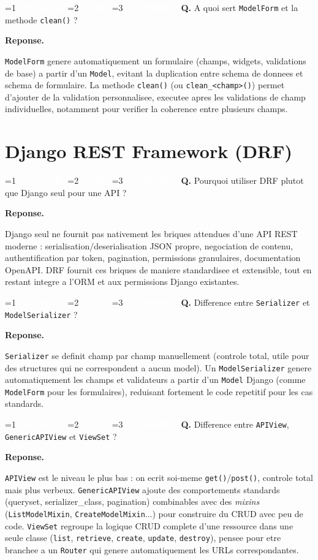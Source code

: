 \documentclass[11pt,a4paper]{article}
\newcommand{\badgeJ}{\textcolor{white}{\colorbox{junior}{\small\bfseries\ JUNIOR\ }}}
\newcommand{\badgeM}{\textcolor{white}{\colorbox{mid}{\small\bfseries\ MID\ }}}
\newcommand{\badgeS}{\textcolor{white}{\colorbox{senior}{\small\bfseries\ SENIOR\ }}}
\newcounter{qcount}
\newenvironment{qa}[2]{%
  \stepcounter{qcount}%
  \par\vspace{6pt}%
  \noindent\colorbox{qbg}{\parbox{\dimexpr\linewidth-12pt}{\vspace{2pt}%
  \ifnum#1=1 \badgeJ\fi\ifnum#1=2 \badgeM\fi\ifnum#1=3 \badgeS\fi
  \ \textbf{Q\theqcount.} #2\vspace{2pt}}}\par\vspace{4pt}%
  \noindent\textbf{\color{accent}Reponse.}\ \ignorespaces
}{%
  \par\vspace{8pt}%
}
\begin{document}
\begin{qa}{2}{A quoi sert \texttt{ModelForm} et la methode \texttt{clean()} ?}
\texttt{ModelForm} genere automatiquement un formulaire (champs, widgets,
validations de base) a partir d'un \texttt{Model}, evitant la duplication
entre schema de donnees et schema de formulaire. La methode \texttt{clean()}
(ou \texttt{clean\_<champ>()}) permet d'ajouter de la validation
personnalisee, executee apres les validations de champ individuelles,
notamment pour verifier la coherence entre plusieurs champs.
\end{qa}

\newpage
\section{Django REST Framework (DRF)}

\begin{qa}{1}{Pourquoi utiliser DRF plutot que Django seul pour une API ?}
Django seul ne fournit pas nativement les briques attendues d'une API REST
moderne : serialisation/deserialisation JSON propre, negociation de contenu,
authentification par token, pagination, permissions granulaires,
documentation OpenAPI. DRF fournit ces briques de maniere standardisee et
extensible, tout en restant integre a l'ORM et aux permissions Django
existantes.
\end{qa}

\begin{qa}{1}{Difference entre \texttt{Serializer} et \texttt{ModelSerializer} ?}
\texttt{Serializer} se definit champ par champ manuellement (controle total,
utile pour des structures qui ne correspondent a aucun model). Un
\texttt{ModelSerializer} genere automatiquement les champs et validateurs a
partir d'un \texttt{Model} Django (comme \texttt{ModelForm} pour les
formulaires), reduisant fortement le code repetitif pour les cas standards.
\end{qa}

\begin{qa}{2}{Difference entre \texttt{APIView}, \texttt{GenericAPIView} et \texttt{ViewSet} ?}
\texttt{APIView} est le niveau le plus bas : on ecrit soi-meme
\texttt{get()}/\texttt{post()}, controle total mais plus verbeux.
\texttt{GenericAPIView} ajoute des comportements standards (queryset,
serializer\_class, pagination) combinables avec des \emph{mixins}
(\texttt{ListModelMixin}, \texttt{CreateModelMixin}...) pour construire du
CRUD avec peu de code. \texttt{ViewSet} regroupe la logique CRUD complete
d'une ressource dans une seule classe (\texttt{list}, \texttt{retrieve},
\texttt{create}, \texttt{update}, \texttt{destroy}), pensee pour etre branchee
a un \texttt{Router} qui genere automatiquement les URLs correspondantes.
\end{qa}
\end{document}
